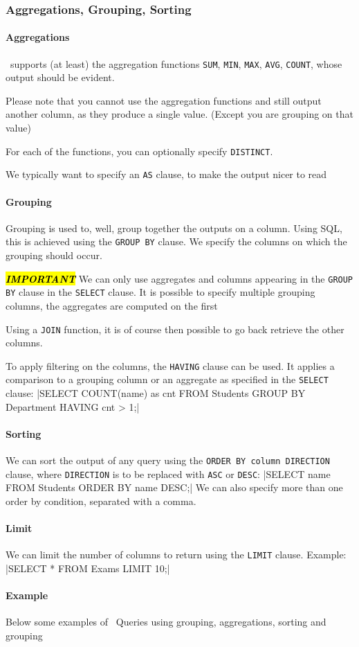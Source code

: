 \newpage
\subsubsection{Aggregations, Grouping, Sorting}
\paragraph{Aggregations}
\sql\ supports (at least) the aggregation functions \texttt{SUM}, \texttt{MIN}, \texttt{MAX}, \texttt{AVG}, \texttt{COUNT},
whose output should be evident.

Please note that you cannot use the aggregation functions and still output another column,
as they produce a single value. (Except you are grouping on that value)

For each of the functions, you can optionally specify \texttt{DISTINCT}.

We typically want to specify an \texttt{AS} clause, to make the output nicer to read


\paragraph{Grouping}
Grouping is used to, well, group together the outputs on a column.
Using SQL, this is achieved using the \texttt{GROUP BY} clause.
We specify the columns on which the grouping should occur.

\hl{\textbf{\textit{IMPORTANT}}} We can only use aggregates and columns appearing in the \texttt{GROUP BY} clause in the \texttt{SELECT} clause.
It is possible to specify multiple grouping columns, the aggregates are computed on the first

Using a \texttt{JOIN} function, it is of course then possible to go back retrieve the other columns.

To apply filtering on the columns, the \texttt{HAVING} clause can be used.
It applies a comparison to a grouping column or an aggregate as specified in the \texttt{SELECT} clause:
|SELECT COUNT(name) as cnt FROM Students GROUP BY Department HAVING cnt > 1;|


\paragraph{Sorting}
We can sort the output of any query using the \texttt{ORDER BY column DIRECTION} clause, where \texttt{DIRECTION} is to be replaced with \texttt{ASC} or \texttt{DESC}:
|SELECT name FROM Students ORDER BY name DESC;|
We can also specify more than one order by condition, separated with a comma.


\paragraph{Limit}
We can limit the number of columns to return using the \texttt{LIMIT} clause. Example:
|SELECT * FROM Exams LIMIT 10;|


\paragraph{Example}
Below some examples of \sql\ Queries using grouping, aggregations, sorting and grouping
